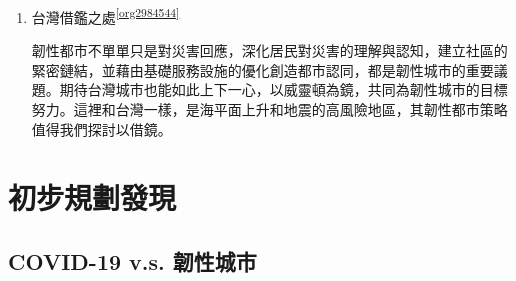 \documentclass[a4paper,12pt]{article}
\begin{document}
\begin{enumerate}
\begin{enumerate}
\item 台灣借鑑之處\textsuperscript{\ref{org2984544}}
\label{sec:org8ee03f5}

韌性都市不單單只是對災害回應，深化居民對災害的理解與認知，建立社區的緊密鏈結，並藉由基礎服務設施的優化創造都市認同，都是韌性城市的重要議題。期待台灣城市也能如此上下一心，以威靈頓為鏡，共同為韌性城市的目標努力。這裡和台灣一樣，是海平面上升和地震的高風險地區，其韌性都市策略值得我們探討以借鏡。\\
\newpage
\end{enumerate}
\end{enumerate}

\section{初步規劃發現}
\label{sec:orge811aba}

\subsection{COVID-19 v.s. 韌性城市}
\label{sec:orgfbc5a5d}
\end{document}
